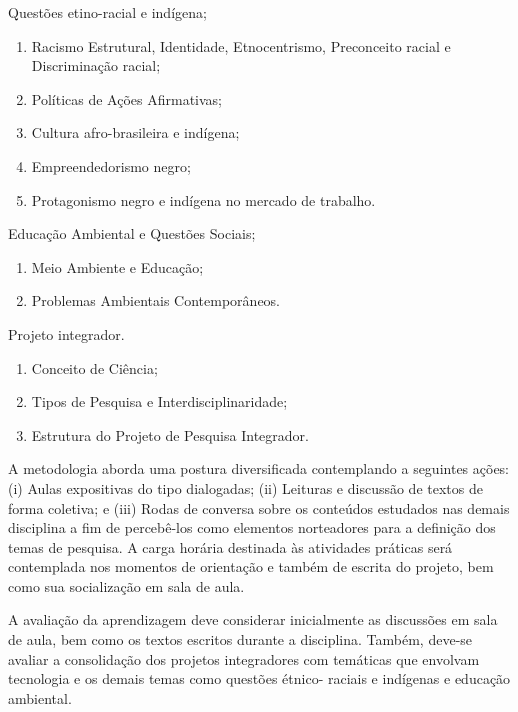 \begin{pud}
\begin{description}[itemsep=0em]
        \item[UNIDADE II:] Questões etino-racial e indígena;
	         \begin{enumerate}[itemsep=0em, topsep=0em]
				\item Racismo Estrutural, Identidade, Etnocentrismo, Preconceito racial e Discriminação racial;
                \item Políticas de Ações Afirmativas;
                \item Cultura afro-brasileira e indígena;
                \item Empreendedorismo negro;
                \item Protagonismo negro e indígena no mercado de trabalho.
            \end{enumerate}
            
         \item[UNIDADE III:]  Educação Ambiental e Questões Sociais;
	         \begin{enumerate}[itemsep=0em, topsep=0em]
				\item Meio Ambiente e Educação;
				\item Problemas Ambientais Contemporâneos.       
            \end{enumerate}
            
         \item[UNIDADE IV:] Projeto integrador.
	         \begin{enumerate}[itemsep=0em, topsep=0em]
                \item Conceito de Ciência;
                \item Tipos de Pesquisa e Interdisciplinaridade;
                \item Estrutura do Projeto de Pesquisa Integrador.
            \end{enumerate}
	\end{description}
	
	
	\metodologia
	A metodologia aborda uma postura diversificada contemplando a seguintes ações: (i) Aulas expositivas do tipo dialogadas; (ii) Leituras e discussão de textos de forma coletiva; e (iii) Rodas de conversa sobre os conteúdos estudados nas demais disciplina a fim de percebê-los como elementos norteadores para a definição dos temas de pesquisa.
	A carga horária destinada às atividades práticas será contemplada nos momentos de orientação e também de escrita do projeto, bem como sua socialização em sala de aula.


	\avaliacao
	A avaliação da aprendizagem deve considerar inicialmente as discussões em sala de aula, bem como os textos escritos durante a disciplina. Também, deve-se avaliar a consolidação dos projetos integradores com temáticas que envolvam tecnologia e os demais temas como questões étnico- raciais e indígenas e educação ambiental.
	

\end{pud}

